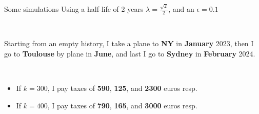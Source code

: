 \documentclass[french,english]{beamer}
\begin{document}
\begin{frame}{Some simulations}
    Using a half-life of 2 years $\lambda = \frac{\sqrt{2}}{2}$, and an $\epsilon = 0.1$
    
    \
    
    Starting from an empty history, I take a plane to \textbf{NY} in \textbf{January} 2023, then I go to \textbf{Toulouse} by plane in \textbf{June}, and  last I go to \textbf{Sydney} in \textbf{February} 2024. 
    
    \
    
    \begin{itemize}
    \item If $k=300$, I pay taxes of \textbf{590}, \textbf{125}, and \textbf{2300} euros resp.
    \item If $k=400$, I pay taxes of \textbf{790}, \textbf{165}, and \textbf{3000} euros resp. 
    \end{itemize}
\end{frame}
\end{document}
